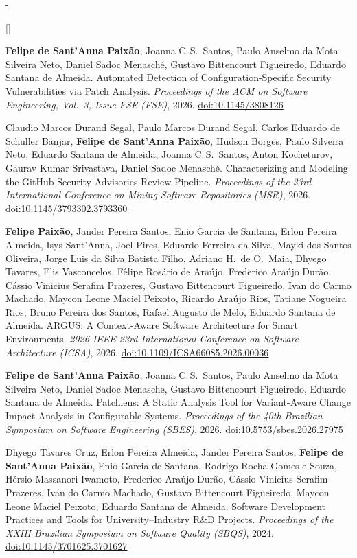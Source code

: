 \documentclass[11pt,letterpaper]{article}
\newlength{\labelcol}\setlength{\labelcol}{1.2in}
\newlength{\labelgap}\setlength{\labelgap}{0.12in}
\newcommand{\cvsection}[1]{%
  \par\vspace{13pt}\noindent
  \llap{\smash{\parbox[t]{\labelcol}{\raggedright\scshape #1}}\hspace{\labelgap}}%
  \par\kern-\baselineskip\ignorespaces}
\newcounter{pub}
\newenvironment{pubs}{\begin{list}{[\arabic{pub}]}{\usecounter{pub}%
  \setlength{\leftmargin}{2.2em}\setlength{\labelwidth}{1.6em}%
  \setlength{\labelsep}{0.6em}\setlength{\topsep}{0pt}%
  \setlength{\itemsep}{3pt}\setlength{\parsep}{0pt}\setlength{\partopsep}{0pt}}}%
  {\end{list}}
\newcommand{\me}{\textbf{Felipe de Sant'Anna Paixão}}
\newcommand{\doi}[1]{\href{https://doi.org/#1}{\textcolor{linkblue}{doi:#1}}}
\begin{document}
\cvsection{Peer-reviewed\\Publications}
\begin{pubs}
  \item\label{pub:fse} \me, Joanna C.\,S.\ Santos, Paulo Anselmo da Mota Silveira Neto, Daniel Sadoc
        Menasché, Gustavo Bittencourt Figueiredo, Eduardo Santana de Almeida.
        Automated Detection of Configuration-Specific Security Vulnerabilities via
        Patch Analysis. \textit{Proceedings of the ACM on Software Engineering, Vol.~3,
        Issue FSE (FSE)}, 2026. \doi{10.1145/3808126}
  \item\label{pub:msr} Claudio Marcos Durand Segal, Paulo Marcos Durand Segal, Carlos Eduardo de
        Schuller Banjar, \me, Hudson Borges, Paulo Silveira Neto, Eduardo Santana de
        Almeida, Joanna C.\,S.\ Santos, Anton Kocheturov, Gaurav Kumar Srivastava,
        Daniel Sadoc Menasché. Characterizing and Modeling the GitHub Security
        Advisories Review Pipeline. \textit{Proceedings of the 23rd International
        Conference on Mining Software Repositories (MSR)}, 2026.
        \doi{10.1145/3793302.3793360}
  \item\label{pub:icsa} \textbf{Felipe Paixão}, Jander Pereira Santos, Enio Garcia de Santana, Erlon
        Pereira Almeida, Isys Sant'Anna, Joel Pires, Eduardo Ferreira da Silva, Mayki
        dos Santos Oliveira, Jorge Luis da Silva Batista Filho, Adriano H.\ de O.\
        Maia, Dhyego Tavares, Elis Vasconcelos, Fêlipe Rosário de Araújo, Frederico
        Araújo Durão, Cássio Vinicius Serafim Prazeres, Gustavo Bittencourt
        Figueiredo, Ivan do Carmo Machado, Maycon Leone Maciel Peixoto, Ricardo Araújo
        Rios, Tatiane Nogueira Rios, Bruno Pereira dos Santos, Rafael Augusto de Melo,
        Eduardo Santana de Almeida. ARGUS: A Context-Aware Software Architecture for
        Smart Environments. \textit{2026 IEEE 23rd International Conference on
        Software Architecture (ICSA)}, 2026. \doi{10.1109/ICSA66085.2026.00036}
  \item\label{pub:sbes} \me, Joanna C.\,S.\ Santos, Paulo Anselmo da Mota Silveira Neto, Daniel Sadoc
        Menasche, Gustavo Bittencourt Figueiredo, Eduardo Santana de Almeida.
        Patchlens: A Static Analysis Tool for Variant-Aware Change Impact Analysis in
        Configurable Systems. \textit{Proceedings of the 40th Brazilian Symposium on
        Software Engineering (SBES)}, 2026. \doi{10.5753/sbes.2026.27975}
  \item\label{pub:sbqs} Dhyego Tavares Cruz, Erlon Pereira Almeida, Jander Pereira Santos, \me, Enio
        Garcia de Santana, Rodrigo Rocha Gomes e Souza, Hérsio Massanori Iwamoto,
        Frederico Araújo Durão, Cássio Vinicius Serafim Prazeres, Ivan do Carmo
        Machado, Gustavo Bittencourt Figueiredo, Maycon Leone Maciel Peixoto, Eduardo
        Santana de Almeida. Software Development Practices and Tools for
        University--Industry R\&D Projects. \textit{Proceedings of the XXIII Brazilian
        Symposium on Software Quality (SBQS)}, 2024. \doi{10.1145/3701625.3701627}
\end{pubs}
\end{document}

